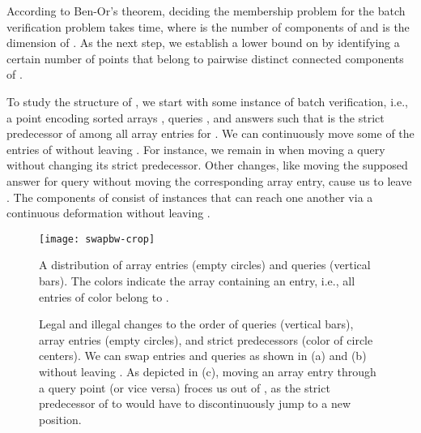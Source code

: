 \documentclass[orivec]{llncs}
\begin{document}
According to Ben-Or's theorem, deciding the membership problem  for the batch verification problem takes  time, where  is the number of components of  and  is the dimension of . As the next step, we establish a lower bound on  by identifying a certain number of points that belong to pairwise distinct connected components of .

To study the structure of , we start with some instance  of batch verification, i.e., a point  encoding  sorted arrays , queries , and answers  such that  is the strict predecessor of  among all array entries for . We can continuously move some of the entries of  without leaving . For instance, we remain in  when moving a query without changing its strict predecessor. Other changes, like moving the supposed answer  for query  without moving the corresponding array entry, cause us to leave . The components of  consist of instances that can reach one another via a continuous deformation without leaving . 
\vspace{-\baselineskip}

\begin{figure}[htb]
	\centering 
	\texttt{[image: swapbw-crop]}
	\caption{A distribution of array entries (empty circles) and queries (vertical bars). The colors indicate the array containing an entry, i.e., all entries of color  belong to .
	\vspace{-3\baselineskip}
	\label{fig::order}}
\end{figure}
\begin{figure}[htb]
	\centering
	
	
	
	
	\caption{Legal and illegal changes to the order of queries (vertical bars), array entries (empty circles), and strict predecessors (color of circle centers). We can swap entries and queries as shown in (a) and (b) without leaving . As depicted in (c), moving an array entry through a query point  (or vice versa) froces us out of , as the strict predecessor of  to would have to discontinuously jump to a new position. \label{fig::swaps}}
	\vspace{-\baselineskip}
\end{figure} 
\end{document}

